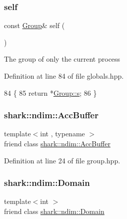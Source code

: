 \subsubsection{\texorpdfstring{self}{self}}
{\footnotesize\ttfamily const \hyperlink{classshark_1_1_group}{Group}\& self (\begin{DoxyParamCaption}{ }\end{DoxyParamCaption})\hspace{0.3cm}{\ttfamily [friend]}}

The group of only the current process 

Definition at line 84 of file globals.\+hpp.


\begin{DoxyCode}
84                                \{
85         \textcolor{keywordflow}{return} *\hyperlink{classshark_1_1_group_a6c59f34c15be2873372cd006c2939da2}{Group::s};
86     \}
\end{DoxyCode}
\hypertarget{classshark_1_1_group_aaf0e46addc08f50274723b3ec7cfa1c7}{}\label{classshark_1_1_group_aaf0e46addc08f50274723b3ec7cfa1c7} 
\subsubsection{\texorpdfstring{shark\+::ndim\+::\+Acc\+Buffer}{shark::ndim::AccBuffer}}
{\footnotesize\ttfamily template$<$int , typename $>$ \\
friend class \hyperlink{classshark_1_1ndim_1_1_acc_buffer}{shark\+::ndim\+::\+Acc\+Buffer}\hspace{0.3cm}{\ttfamily [friend]}}



Definition at line 24 of file group.\+hpp.

\hypertarget{classshark_1_1_group_a0c647ce15d76f9253c6236ffa219ee33}{}\label{classshark_1_1_group_a0c647ce15d76f9253c6236ffa219ee33} 
\subsubsection{\texorpdfstring{shark\+::ndim\+::\+Domain}{shark::ndim::Domain}}
{\footnotesize\ttfamily template$<$int $>$ \\
friend class \hyperlink{classshark_1_1ndim_1_1_domain}{shark\+::ndim\+::\+Domain}\hspace{0.3cm}{\ttfamily [friend]}}



